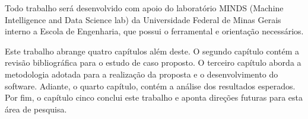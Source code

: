 Todo trabalho será desenvolvido com apoio do laboratório MINDS (Machine Intelligence and Data Science lab) da Universidade Federal de Minas Gerais interno a Escola de Engenharia, que possui o ferramental e orientação necessários.


Este trabalho abrange quatro capítulos além deste. O segundo capítulo contém a revisão bibliográfica para o estudo de caso proposto. O terceiro capítulo aborda a metodologia adotada para a realização da proposta e o desenvolvimento do software. Adiante, o quarto capítulo, contém a análise dos resultados esperados. Por fim, o capítulo cinco conclui este trabalho e aponta direções futuras para esta área de pesquisa.



